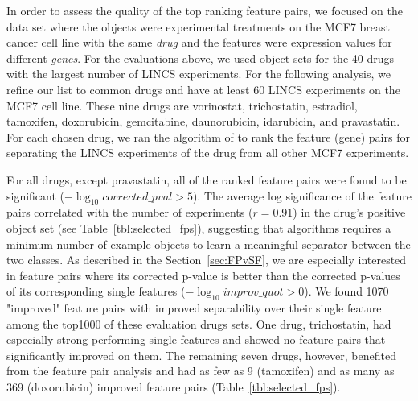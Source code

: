 
 In order to assess the quality of the top ranking feature pairs, we focused on the \lincs data set where the objects were experimental treatments on the MCF7 breast cancer cell line with the same {\em drug} and the features were expression values for different {\em genes}. For the evaluations above, we used object sets for the 40 drugs with the largest number of LINCS experiments. For the following analysis, we refine our list to common drugs
 
and have at least 60 LINCS experiments on the MCF7 cell line. These nine drugs are vorinostat, trichostatin, estradiol, tamoxifen, doxorubicin, gemcitabine, daunorubicin, idarubicin, and pravastatin. For each chosen drug, we ran the \sampOpt algorithm of \genviz to rank the \topthousand feature (gene) pairs for separating the LINCS experiments of the drug from all other MCF7 experiments.

For all drugs, except pravastatin, all of the \topthousand ranked feature pairs were found to be significant ($-\log_{10} corrected\_pval > 5$). The average log significance of the \topthousand feature pairs correlated with the number of experiments ($r=0.91$) in the drug's positive object set (see Table~\ref{tbl:selected_fps}), suggesting that \genviz algorithms requires a minimum number of example objects to learn a meaningful separator between the two classes.  As described in the Section~\ref{sec:FPvSF}, we are especially interested in feature pairs where its corrected p-value is better than the corrected p-values of its corresponding single features ($-\log_{10} improv\_quot > 0$). We found 1070 "improved" feature pairs with improved separability over their single feature among the top1000 of these evaluation drugs sets. One drug, trichostatin, had especially strong performing single features and showed no feature pairs that significantly improved on them. The remaining seven drugs, however, benefited from the feature pair analysis and had as few as 9 (tamoxifen) and as many as 369 (doxorubicin) improved feature pairs (Table~\ref{tbl:selected_fps}). 

